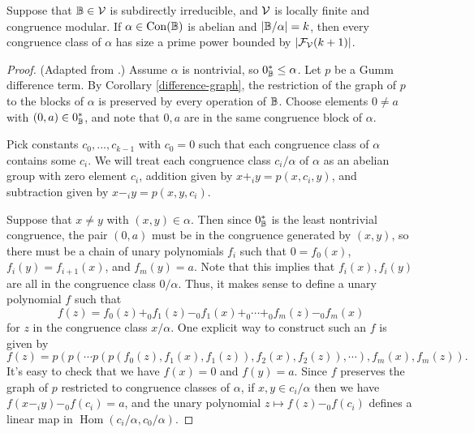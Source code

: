 \documentclass[letterpaper,11pt]{article}
\DeclareMathOperator{\Con}{Con}
\DeclareMathOperator{\Hom}{Hom}
\begin{document}
\begin{thm}\label{subdirect-ab-prime-power} Suppose that $\mathbb{B} \in \mathcal{V}$ is subdirectly irreducible, and $\mathcal{V}$ is locally finite and congruence modular. If $\alpha \in \Con(\bB)$ is abelian and $|\mathbb{B}/\alpha| = k$, then every congruence class of $\alpha$ has size a prime power bounded by $|\mathcal{F}_{\mathcal{V}}(k+1)|$.
\end{thm}
\begin{proof} (Adapted from \cite{commutator-uses}.) Assume $\alpha$ is nontrivial, so $0_{\mathbb{B}}^* \le \alpha$. Let $p$ be a Gumm difference term. By Corollary \ref{difference-graph}, the restriction of the graph of $p$ to the blocks of $\alpha$ is preserved by every operation of $\mathbb{B}$. Choose elements $0 \ne a$ with $(0,a) \in 0_{\mathbb{B}}^*$, and note that $0,a$ are in the same congruence block of $\alpha$.

Pick constants $c_0, ..., c_{k-1}$ with $c_0 = 0$ such that each congruence class of $\alpha$ contains some $c_i$. We will treat each congruence class $c_i/\alpha$ of $\alpha$ as an abelian group with zero element $c_i$, addition given by $x +_i y = p(x,c_i,y)$, and subtraction given by $x -_i y = p(x,y,c_i)$.

Suppose that $x \ne y$ with $(x,y) \in \alpha$. Then since $0_{\mathbb{B}}^*$ is the least nontrivial congruence, the pair $(0,a)$ must be in the congruence generated by $(x,y)$, so there must be a chain of unary polynomials $f_i$ such that $0 = f_0(x)$, $f_i(y) = f_{i+1}(x)$, and $f_m(y) = a$. Note that this implies that $f_i(x), f_i(y)$ are all in the congruence class $0/\alpha$. Thus, it makes sense to define a unary polynomial $f$ such that
\[
f(z) = f_0(z) +_0 f_1(z) -_0 f_1(x) +_0 \cdots +_0 f_m(z) -_0 f_m(x)
\]
for $z$ in the congruence class $x/\alpha$. One explicit way to construct such an $f$ is given by
\[
f(z) = p(p(\cdots p(p(f_0(z),f_1(x),f_1(z)), f_2(x), f_2(z)), \cdots), f_m(x), f_m(z)).
\]
It's easy to check that we have $f(x) = 0$ and $f(y) = a$. Since $f$ preserves the graph of $p$ restricted to congruence classes of $\alpha$, if $x,y \in c_i/\alpha$ then we have $f(x -_i y) -_0 f(c_i) = a$, and the unary polynomial $z \mapsto f(z) -_0 f(c_i)$ defines a linear map in $\Hom(c_i/\alpha, c_0/\alpha)$.


\end{proof}
\end{document}
